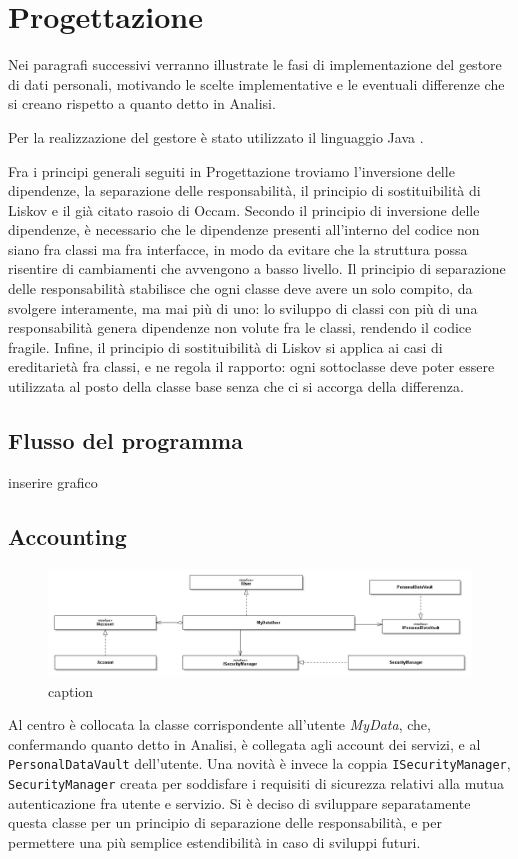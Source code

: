 \chapter{Progettazione}
\label{capitolo5}
\thispagestyle{empty}

\noindent Nei paragrafi successivi verranno illustrate le fasi di implementazione del gestore di dati personali, motivando le scelte implementative e le eventuali differenze che si creano rispetto a quanto detto in Analisi.

Per la realizzazione del gestore \`e stato utilizzato il linguaggio Java\cite{javalanguagespecs} \cite{java8api}.

Fra i principi generali seguiti in Progettazione troviamo l’inversione delle dipendenze, la separazione delle responsabilit\`a, il principio di sostituibilit\`a di Liskov e il gi\`a citato rasoio di Occam. Secondo il principio di inversione delle dipendenze, \`e necessario che le dipendenze presenti all’interno del codice non siano fra classi ma fra interfacce, in modo da evitare che la struttura possa risentire di cambiamenti che avvengono a basso livello. Il principio di separazione delle responsabilit\`a stabilisce che ogni classe deve avere un solo compito, da svolgere interamente, ma mai pi\`u di uno: lo sviluppo di classi con pi\`u di una responsabilit\`a genera dipendenze non volute fra le classi, rendendo il codice fragile. Infine, il principio di sostituibilit\`a di Liskov si applica ai casi di ereditariet\`a fra classi, e ne regola il rapporto: ogni sottoclasse deve poter essere utilizzata al posto della classe base senza che ci si accorga della differenza.

\section{Flusso del programma}
inserire grafico

\section{Accounting}
\begin{figure} [h]
	\includegraphics[width=\linewidth]{pictures/Accounting-closed.png}
	\caption{caption}
	\label{fig:Accounting-closed}
\end{figure}
Al centro \`e collocata la classe corrispondente all’utente \textit{MyData}, che, confermando quanto detto in Analisi, \`e collegata agli account dei servizi, e al \texttt{PersonalDataVault} dell’utente. Una novit\`a \`e invece la coppia \texttt{ISecurityManager}, \texttt{SecurityManager} creata per soddisfare i requisiti di sicurezza relativi alla mutua autenticazione fra utente e servizio. Si \`e deciso di sviluppare separatamente questa classe per un principio di separazione delle responsabilit\`a, e per permettere una pi\`u semplice estendibilit\`a in caso di sviluppi futuri.

